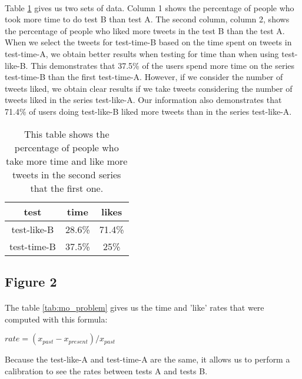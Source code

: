 \paragraph{}
Table \ref{tab:mo_money} gives us two sets of data. Column 1 shows the percentage of people who took more time to do test B than test A. The second column, column 2, shows the percentage of people who liked more tweets in the test B than the test A.\\
When we select the tweets for test-time-B based on the time spent on tweets in test-time-A, we obtain better results when testing for time than when using test-like-B. This demonstrates that 37.5\% of the users spend more time on the series test-time-B than the first test-time-A. However, if we consider the number of tweets liked, we obtain clear results if we take tweets considering the number of tweets liked in the series test-like-A. Our information also demonstrates that 71.4\% of users doing test-like-B liked more tweets than in the series test-like-A.

\begin{table}[h]
\centering
\begin{tabular}{ccc}
\toprule
test & time & likes \\ 
\midrule
test-like-B & 28.6\%	& 71.4\% \\
test-time-B & 37.5\% & 25\% \\
\bottomrule 
\end{tabular}
\caption[More time \& likes]{This table shows the percentage of people who take more time and like more tweets in the second series that the first one.}
\label{tab:mo_money}
\end{table}

\subsection{Figure 2}

\paragraph{}
The table \ref{tab:mo_problem} gives us the time and 'like' rates that were computed with this formula:

\begin{center}
$rate={(x_{past}-x_{present})}/{x_{past}}$
\end{center}

Because the test-like-A and test-time-A are the same, it allows us to perform a calibration to see the rates between tests A and tests B.

